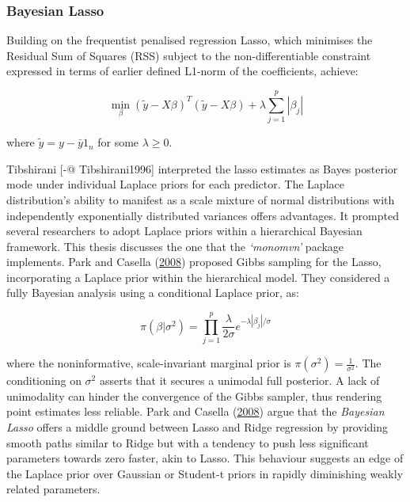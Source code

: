 \documentclass[
  11pt,
]{article}
\begin{document}
\subsubsection{Bayesian Lasso}

Building on the frequentist penalised regression Lasso, which minimises
the Residual Sum of Squares (RSS) subject to the non-differentiable
constraint expressed in terms of earlier defined L1-norm of the
coefficients, achieve:

\begin{equation}
\min_{\beta} \left(\tilde{y} - X\beta \right)^T \left(\tilde{y} - X\beta \right) + \lambda \sum_{j=1}^{p} |\beta_j|
\end{equation}

where \(\tilde{y} = y - \bar{y}1_n\) for some \(\lambda \geq 0\).

Tibshirani {[}-@ Tibshirani1996{]} interpreted the lasso estimates as
Bayes posterior mode under individual Laplace priors for each predictor.
The Laplace distribution's ability to manifest as a scale mixture of
normal distributions with independently exponentially distributed
variances offers advantages. It prompted several researchers to adopt
Laplace priors within a hierarchical Bayesian framework. This thesis
discusses the one that the \emph{`monomvn'} package implements. Park and
Casella (\protect\hyperlink{ref-Casella2008}{2008}) proposed Gibbs
sampling for the Lasso, incorporating a Laplace prior within the
hierarchical model. They considered a fully Bayesian analysis using a
conditional Laplace prior, as:

\begin{equation}
\pi(\beta|\sigma^2) = \prod_{j=1}^{p} \frac{\lambda}{2\sigma} e^{-\lambda|\beta_j|/\sigma}
\end{equation}

where the noninformative, scale-invariant marginal prior is
\(\pi(\sigma^2) = \frac{1}{\sigma^2}\). The conditioning on \(\sigma^2\)
asserts that it secures a unimodal full posterior. A lack of unimodality
can hinder the convergence of the Gibbs sampler, thus rendering point
estimates less reliable. Park and Casella
(\protect\hyperlink{ref-Casella2008}{2008}) argue that the
\emph{Bayesian Lasso} offers a middle ground between Lasso and Ridge
regression by providing smooth paths similar to Ridge but with a
tendency to push less significant parameters towards zero faster, akin
to Lasso. This behaviour suggests an edge of the Laplace prior over
Gaussian or Student-t priors in rapidly diminishing weakly related
parameters.
\end{document}
